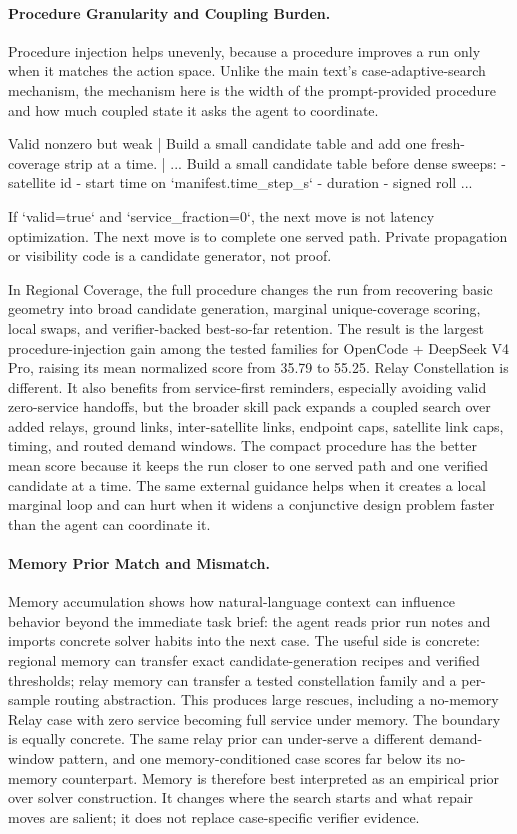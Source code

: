 \documentclass[11pt]{article}
\newenvironment{promptblock}
  {\VerbatimEnvironment\par\smallskip\Needspace{10\baselineskip}\noindent\begin{promptblockinner}}
  {\end{promptblockinner}\par\smallskip}
\begin{document}
\paragraph{Procedure Granularity and Coupling Burden.} Procedure injection helps unevenly, because a procedure improves a run only when it matches the action space. Unlike the main text's case-adaptive-search mechanism, the mechanism here is the width of the prompt-provided procedure and how much coupled state it asks the agent to coordinate.
\begin{promptblock}
Valid nonzero but weak | Build a small candidate table and add one
fresh-coverage strip at a time. |
...
Build a small candidate table before dense sweeps:
- satellite id
- start time on `manifest.time_step_s`
- duration
- signed roll
...
\end{promptblock}
\begin{promptblock}
If `valid=true` and `service_fraction=0`, the next move is not latency
optimization. The next move is to complete one served path.
Private propagation or visibility code is a candidate generator, not proof.
\end{promptblock}
In Regional Coverage, the full procedure changes the run from recovering basic geometry into broad candidate generation, marginal unique-coverage scoring, local swaps, and verifier-backed best-so-far retention. The result is the largest procedure-injection gain among the tested families for OpenCode + DeepSeek V4 Pro, raising its mean normalized score from 35.79 to 55.25. Relay Constellation is different. It also benefits from service-first reminders, especially avoiding valid zero-service handoffs, but the broader skill pack expands a coupled search over added relays, ground links, inter-satellite links, endpoint caps, satellite link caps, timing, and routed demand windows. The compact procedure has the better mean score because it keeps the run closer to one served path and one verified candidate at a time. The same external guidance helps when it creates a local marginal loop and can hurt when it widens a conjunctive design problem faster than the agent can coordinate it.

\paragraph{Memory Prior Match and Mismatch.} Memory accumulation shows how natural-language context can influence behavior beyond the immediate task brief: the agent reads prior run notes and imports concrete solver habits into the next case.
The useful side is concrete: regional memory can transfer exact candidate-generation recipes and verified thresholds; relay memory can transfer a tested constellation family and a per-sample routing abstraction. This produces large rescues, including a no-memory Relay case with zero service becoming full service under memory. The boundary is equally concrete. The same relay prior can under-serve a different demand-window pattern, and one memory-conditioned case scores far below its no-memory counterpart. Memory is therefore best interpreted as an empirical prior over solver construction. It changes where the search starts and what repair moves are salient; it does not replace case-specific verifier evidence.
\end{document}
